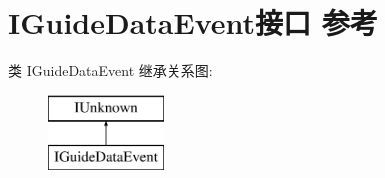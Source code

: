 \hypertarget{interface_i_guide_data_event}{}\section{I\+Guide\+Data\+Event接口 参考}
\label{interface_i_guide_data_event}
类 I\+Guide\+Data\+Event 继承关系图\+:\begin{figure}[H]
\begin{center}
\leavevmode
\includegraphics[height=2.000000cm]{interface_i_guide_data_event}
\end{center}
\end{figure}

